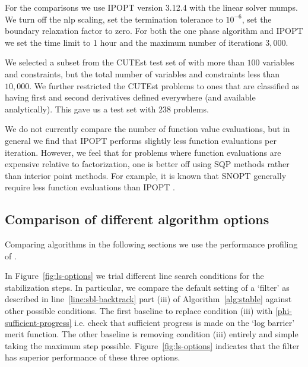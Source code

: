 \documentclass{article}
\begin{document}
For the comparisons we use IPOPT version 3.12.4 with the linear solver mumps. We turn off the nlp scaling, set the termination tolerance to $10^{-6}$, set the boundary relaxation factor to zero. For both the one phase algorithm and IPOPT we set the time limit to 1 hour and the maximum number of iterations $3,000$.

We selected a subset from the CUTEst test set of with more than $100$ variables and constraints, but the total number of variables and constraints less than $10,000$. We further restricted the CUTEst problems to ones that are classified as having first and second derivatives defined everywhere (and available analytically). This gave us a test set with $238$ problems.

We do not currently compare the number of function value evaluations, but in general we find that IPOPT performs slightly less function evaluations per iteration. However, we feel that for problems where function evaluations are expensive relative to factorization, one is better off using SQP methods rather than interior point methods. For example, it is known that SNOPT generally require less function evaluations than IPOPT \cite[Figure 2, Figure 3]{gill2015performance}.

\subsection{Comparison of different algorithm options}\label{alg:comparison-options}

Comparing algorithms in the following sections we use the performance profiling of \cite{dolan2002benchmarking}.



In Figure~\ref{fig:ls-options} we trial different line search conditions for the stabilization steps. In particular, we compare the default setting of a `filter' as described in line~\eqref{line:sbl-backtrack} part (iii) of Algorithm~\ref{alg:stable} against other possible conditions. The first baseline to replace condition (iii) with  \eqref{phi-sufficient-progress} i.e. check that sufficient progress is made on the `log barrier' merit function. The other baseline is removing condition (iii) entirely and simple taking the maximum step possible. Figure~\ref{fig:ls-options} indicates that the filter has superior performance of these three options.
\end{document}
